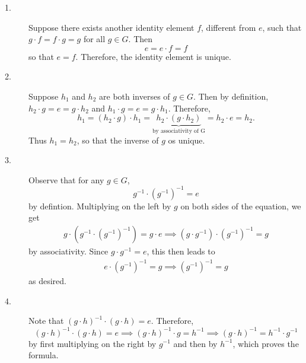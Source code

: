 \documentclass[12pt,letterpaper]{algebra_book}
\theoremstyle{definition}
\begin{document}
\begin{prf}
    \begin{description}
        \item[1.] Suppose there exists another identity 
        element $f$, different from $e$, such that
        $g \cdot f = f \cdot g = g$ for all $g \in G$. Then 
        \[
            e = e \cdot f = f
        \]
        so that $e = f$. Therefore, the identity element is unique.

        \item[2.] Suppose $h_1$ and $h_2$ are both inverses of $g \in
        G$. Then by definition, $h_2 \cdot g = e = g \cdot h_2$ and $h_1 \cdot g = e
        = g \cdot h_1$. Therefore, 
        \[
            h_1 = (h_2 \cdot g) \cdot h_1 = \underbrace{h_2 \cdot (g \cdot h_2)}_{\text{by associativity of G}}
            = h_2 \cdot e = h_2.
        \]
        Thus $h_1 = h_2$, so that the inverse of $g$ os unique. 

        \item[3.] Observe that for any $g \in G$,
        \[
            g^{-1}\cdot (g^{-1})^{-1} = e
        \]
        by defintion. Multiplying on the left by $g$ on both sides of
        the equation, we get 
        \begin{align*}
            g \cdot (g^{-1} \cdot (g^{-1})^{-1}) = g \cdot e
            \implies (g \cdot g^{-1}) \cdot (g^{-1})^{-1} = g 
        \end{align*}
        by associativity. Since $g \cdot g^{-1} = e$, this then leads to 
        \begin{align*}
            e \cdot (g^{-1})^{-1} = g \implies (g^{-1})^{-1} = g
        \end{align*}
        as desired.

        \item[4.] Note that $(g \cdot h)^{-1} \cdot (g \cdot h) = e.$
        Therefore,
        \[
            (g \cdot h)^{-1} \cdot (g \cdot h) = e \implies (g \cdot h)^{-1} \cdot g = h^{-1}
            \implies (g \cdot h)^{-1} = h^{-1} \cdot g^{-1}
        \] 
        by first multiplying on the right by $g^{-1}$ and then by
        $h^{-1}$, which proves the formula.


\end{description}
\end{prf}
\end{document}
